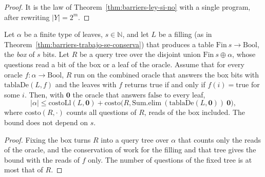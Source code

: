 \begin{proof}
  \leanok
  It is the law of Theorem~\ref{thm:barriers-ley-si-no} with a single program, after rewriting
  $|Y| = 2^m$.
\end{proof}

\begin{theorem}
  \label{thm:barriers-plano-generacion}
  \leanok
  Let $\alpha$ be a finite type of leaves, $s \in \mathbb{N}$, and let $L$ be a filling (as in
  Theorem~\ref{thm:barriers-trabajo-se-conserva}) that produces a table $\mathrm{Fin}\ s \to
  \mathrm{Bool}$, the \emph{box} of $s$ bits. Let $R$ be a query tree over the disjoint union
  $\mathrm{Fin}\ s \oplus \alpha$, whose questions read a bit of the box or a leaf of the oracle.
  Assume that for every oracle $f : \alpha \to \mathrm{Bool}$, $R$ run on the combined oracle that
  answers the box bits with $\mathrm{tablaDe}(L, f)$ and the leaves with $f$ returns $\mathrm{true}$
  if and only if $f(i) = \mathrm{true}$ for some $i$. Then, with $\mathbf{0}$ the oracle that answers
  $\mathrm{false}$ to every leaf,
  \[
    |\alpha| \le \mathrm{costoLl}(L, \mathbf{0}) + \mathrm{costo}\bigl(R, \mathrm{Sum.elim}\ (\mathrm{tablaDe}(L, \mathbf{0}))\ \mathbf{0}\bigr),
  \]
  where $\mathrm{costo}(R, \cdot)$ counts all questions of $R$, reads of the box included. The bound
  does not depend on $s$.
  \own{}
\end{theorem}

\begin{proof}
  \leanok
  Fixing the box turns $R$ into a query tree over $\alpha$ that counts only the reads of the
  oracle, and the conservation of work for the filling and that tree gives the bound with the
  reads of $f$ only. The number of questions of the fixed tree is at most that of $R$.
\end{proof}

